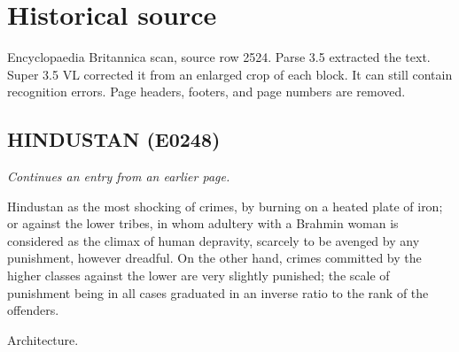 \documentclass{article}
\begin{document}
\section*{Historical source}
Encyclopaedia Britannica scan, source row 2524. Parse 3.5 extracted the text. Super 3.5 VL corrected it from an enlarged crop of each block. It can still contain recognition errors.
Page headers, footers, and page numbers are removed.

\subsection*{HINDUSTAN (E0248)}
\textit{Continues an entry from an earlier page.}

Hindustan as the most shocking of crimes, by burning on a heated plate of iron; or against the lower tribes, in whom adultery with a Brahmin woman is considered as the climax of human depravity, scarcely to be avenged by any punishment, however dreadful. On the other hand, crimes committed by the higher classes against the lower are very slightly punished; the scale of punishment being in all cases graduated in an inverse ratio to the rank of the offenders.

Architecture.
\end{document}
